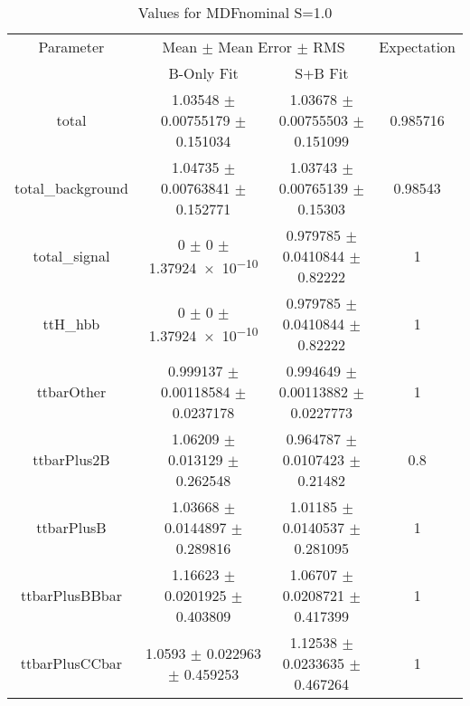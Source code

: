 \begin{table}
\centering
\caption{Values for MDFnominal S=1.0}
\begin{tabular}{cccc}
\toprule
Parameter & \multicolumn{2}{c}{Mean $\pm$ Mean Error $\pm$ RMS} & Expectation\\
 & B-Only Fit & S+B Fit & \\
\midrule
total & \num{1.03548} $\pm$ \num{0.00755179} $\pm$ \num{0.151034} & \num{1.03678} $\pm$ \num{0.00755503} $\pm$ \num{0.151099} & \num{0.985716}\\
total\_background & \num{1.04735} $\pm$ \num{0.00763841} $\pm$ \num{0.152771} & \num{1.03743} $\pm$ \num{0.00765139} $\pm$ \num{0.15303} & \num{0.98543}\\
total\_signal & \num{0} $\pm$ \num{0} $\pm$ \num{1.37924e-10} & \num{0.979785} $\pm$ \num{0.0410844} $\pm$ \num{0.82222} & \num{1}\\
ttH\_hbb & \num{0} $\pm$ \num{0} $\pm$ \num{1.37924e-10} & \num{0.979785} $\pm$ \num{0.0410844} $\pm$ \num{0.82222} & \num{1}\\
ttbarOther & \num{0.999137} $\pm$ \num{0.00118584} $\pm$ \num{0.0237178} & \num{0.994649} $\pm$ \num{0.00113882} $\pm$ \num{0.0227773} & \num{1}\\
ttbarPlus2B & \num{1.06209} $\pm$ \num{0.013129} $\pm$ \num{0.262548} & \num{0.964787} $\pm$ \num{0.0107423} $\pm$ \num{0.21482} & \num{0.8}\\
ttbarPlusB & \num{1.03668} $\pm$ \num{0.0144897} $\pm$ \num{0.289816} & \num{1.01185} $\pm$ \num{0.0140537} $\pm$ \num{0.281095} & \num{1}\\
ttbarPlusBBbar & \num{1.16623} $\pm$ \num{0.0201925} $\pm$ \num{0.403809} & \num{1.06707} $\pm$ \num{0.0208721} $\pm$ \num{0.417399} & \num{1}\\
ttbarPlusCCbar & \num{1.0593} $\pm$ \num{0.022963} $\pm$ \num{0.459253} & \num{1.12538} $\pm$ \num{0.0233635} $\pm$ \num{0.467264} & \num{1}\\
\bottomrule
\end{tabular}
\end{table}